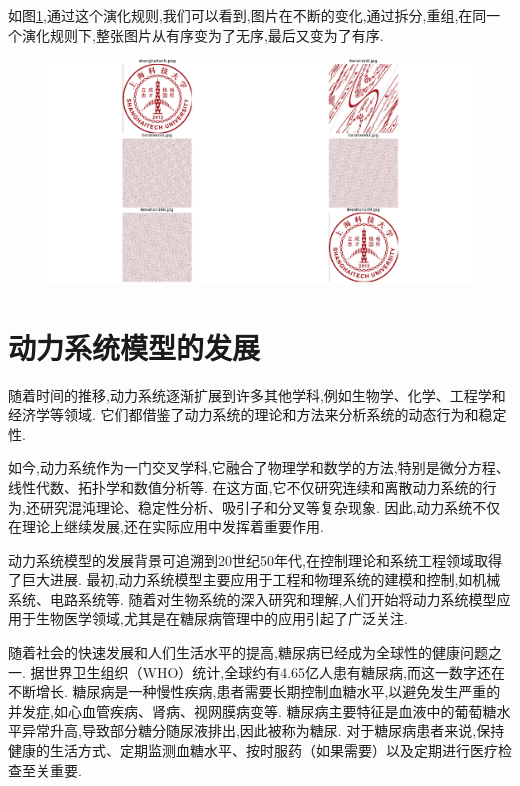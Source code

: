 如图\ref{fig:arnold_cat_map},通过这个演化规则,我们可以看到,图片在不断的变化,通过拆分,重组,在同一个演化规则下,整张图片从有序变为了无序,最后又变为了有序. 

\begin{figure}[H]
    \centering
    \includegraphics[width=\textwidth]{Img/arnold.png}
    \label{fig:arnold_cat_map}
\end{figure}

\section{动力系统模型的发展}
随着时间的推移,动力系统逐渐扩展到许多其他学科,例如生物学、化学、工程学和经济学等领域. 它们都借鉴了动力系统的理论和方法来分析系统的动态行为和稳定性. 

如今,动力系统作为一门交叉学科,它融合了物理学和数学的方法,特别是微分方程、线性代数、拓扑学和数值分析等. 在这方面,它不仅研究连续和离散动力系统的行为,还研究混沌理论、稳定性分析、吸引子和分叉等复杂现象. 因此,动力系统不仅在理论上继续发展,还在实际应用中发挥着重要作用. 

动力系统模型的发展背景可追溯到20世纪50年代,在控制理论和系统工程领域取得了巨大进展. 最初,动力系统模型主要应用于工程和物理系统的建模和控制,如机械系统、电路系统等\cite{hargrove1998dynamic}. 随着对生物系统的深入研究和理解,人们开始将动力系统模型应用于生物医学领域,尤其是在糖尿病管理中的应用引起了广泛关注\cite{ellner2006dynamic}. 

随着社会的快速发展和人们生活水平的提高,糖尿病已经成为全球性的健康问题之一. 据世界卫生组织（WHO）统计,全球约有4.65亿人患有糖尿病,而这一数字还在不断增长\cite{zimmet2016diabetes}. 糖尿病是一种慢性疾病,患者需要长期控制血糖水平,以避免发生严重的并发症,如心血管疾病、肾病、视网膜病变等\cite{zheng2018global}. 糖尿病主要特征是血液中的葡萄糖水平异常升高,导致部分糖分随尿液排出,因此被称为糖尿. 对于糖尿病患者来说,保持健康的生活方式、定期监测血糖水平、按时服药（如果需要）以及定期进行医疗检查至关重要. 

